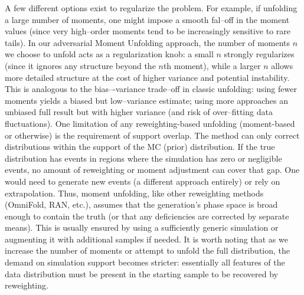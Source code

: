         A few different options exist to regularize the problem.
        For example, if unfolding a large number of moments, one might impose a smooth fal--off in the moment values (since very high--order moments tend to be increasingly sensitive to rare tails).
        In our adversarial Moment Unfolding approach, the number of moments $n$ we choose to unfold acts as a regularization knob: a small $n$ strongly regularizes (since it ignores any structure beyond the $n$th moment), while a larger $n$ allows more detailed structure at the cost of higher variance and potential instability.\kd{}
        This is analogous to the bias–-variance trade--off in classic unfolding: using fewer moments yields a biased but low--variance estimate; using more approaches an unbiased full result but with higher variance (and risk of over--fitting data fluctuations).
        One limitation of any reweighting-based unfolding (moment-based or otherwise) is the requirement of support overlap.
        The method can only correct distributions within the support of the MC (prior) distribution.
        If the true distribution has events in regions where the simulation has zero or negligible events, no amount of reweighting or moment adjustment can cover that gap.
        One would need to generate new events (a different approach entirely) or rely on extrapolation.
        Thus, moment unfolding, like other reweighting methods (OmniFold, RAN, etc.), assumes that the generation's phase space is broad enough to contain the truth (or that any deficiencies are corrected by separate means).
        This is usually ensured by using a sufficiently generic simulation or augmenting it with additional samples if needed.
        It is worth noting that as we increase the number of moments or attempt to unfold the full distribution, the demand on simulation support becomes stricter: essentially all features of the data distribution must be present in the starting sample to be recovered by reweighting.

